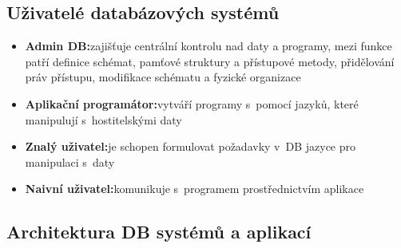 \documentclass[a4paper,10pt]{article}
\newcommand{\pojem}[2]{\item \textbf{#1:}\quad #2}
\begin{document}
			\subsection{Uživatelé databázových systémů}
				\begin{itemize}
					\pojem{Admin DB}{zajišťuje centrální kontrolu nad daty a programy, mezi funkce patří definice schémat, pamťové struktury a přístupové metody, přidělování práv přístupu, modifikace schématu a fyzické organizace}
					\pojem{Aplikační programátor}{vytváří programy s~pomocí jazyků, které manipulují s~hostitelskými daty}
					\pojem{Znalý uživatel}{je schopen formulovat požadavky v~DB jazyce pro manipulaci s~daty}
					\pojem{Naivní uživatel}{komunikuje s~programem prostřednictvím aplikace}
				\end{itemize}

			\subsection{Architektura DB systémů a aplikací}
\end{document}
